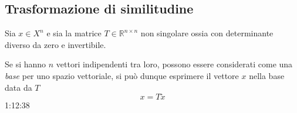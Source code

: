 \subsection{Trasformazione di similitudine}
Sia $x\in X^n$ e sia la matrice $T \in \mathbb{R}^{n\times n}$ non singolare
ossia con determinante diverso da zero e invertibile.

Se si hanno $n$ vettori indipendenti tra loro, possono essere considerati come
una \textit{base} per uno spazio vettoriale, si può dunque esprimere il vettore
$x$ nella base data da $T$
$$
x = T \tilde{x}
$$
1:12:38
